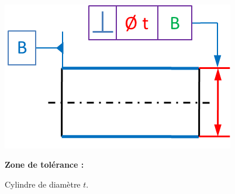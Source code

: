 \documentclass[11pt,oneside]{article}
\begin{document}
\begin{exemple}
\begin{minipage}[t]{.3\linewidth}
\begin{center}
$\;$ 

\includegraphics[width=.95\textwidth]{png/zt_cyl}
\end{center}
\end{minipage} \hfill
\begin{minipage}[t]{.3\linewidth}
\textbf{Zone de tolérance :}

Cylindre de diamètre $t$.
\end{minipage} \hfill
\begin{minipage}[t]{.3\linewidth}
\begin{center}
\end{center}
\end{minipage} 
\end{exemple}

%
\end{document}
